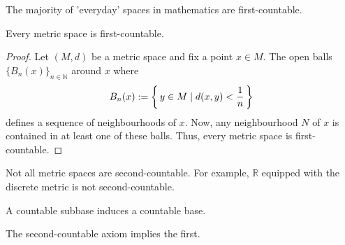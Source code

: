 \begin{rembox}
    \begin{remark}
        The majority of 'everyday' spaces in mathematics are first-countable.
    \end{remark}
\end{rembox}

\begin{exmbox}
    \begin{example}
        Every metric space is first-countable.
    \end{example}
\end{exmbox}

\begin{proof}
    Let \((M, d)\) be a metric space and fix a point \(x \in M\). The open balls \(\{B_n(x)\}_{n \in \mathbb{N}}\) around \(x\) where
    \begin{align*}
        B_n(x) := \left\{\, y \in M \mid d(x, y) < \frac{1}{n} \,\right\}
    \end{align*}
    defines a sequence of neighbourhoods of \(x\). Now, any neighbourhood \(N\) of \(x\) is contained in at least one of these balls. Thus, every metric space is first-countable.
\end{proof}

\begin{exmbox}
    \begin{example}
        Not all metric spaces are second-countable. For example, \(\mathbb{R}\) equipped with the discrete metric is not second-countable.
    \end{example}
\end{exmbox}

\begin{rembox}
    \begin{remark}
        A countable subbase induces a countable base.
    \end{remark}
\end{rembox}

\begin{thmbox}
    \begin{lemma}
        The second-countable axiom implies the first.
    \end{lemma}
\end{thmbox}


